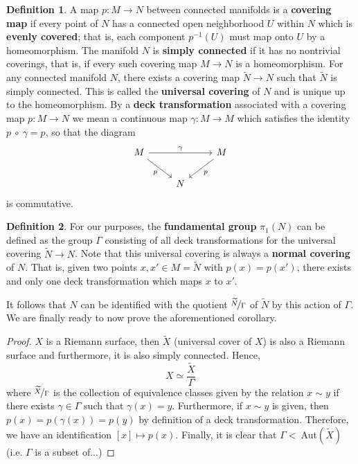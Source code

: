 \documentclass[a4paper, 11pt]{book}
\theoremstyle{definition}
\newtheorem{definition}{Definition}[section]
\theoremstyle{remark}
\begin{document}
    \begin{definition}
        A map $p: M\to N$ between connected manifolds is a \textbf{covering map} if every point of $N$ has a connected open
        neighborhood $U$ within $N$ which is \textbf{evenly covered}; that is, each component $p^{-1}(U)$ must map onto $U$
        by a homeomorphism. The manifold $N$ is \textbf{simply connected} if it has no nontrivial coverings, that is, if every
        such covering map $M \to N$ is a homeomorphism. For any connected manifold $N$, there exists a covering map $\widetilde{N}
        \to N$ such that $\widetilde{N}$ is simply connected. This is called the \textbf{universal covering} of $N$ and is
        unique up to the homeomorphism. By a \textbf{deck transformation} associated with a covering map $p: M\to N$ we mean
        a continuous map $\gamma:M\to M$ which satisfies the identity $p\:\circ\:\gamma = p$, so that the diagram
        \begin{equation*}
        \begin{tikzcd}
            M \arrow[rr, "\gamma"] \arrow[dr, "p",swap]&  & M\arrow[dl, "p"]\\ 
            & N &
        \end{tikzcd}
        \end{equation*}
        is commutative.
    \end{definition}

    \newpage

    \begin{definition}
        For our purposes, the \textbf{fundamental group} $\pi_1(N)$ can be defined as the group $\Gamma$ consisting of all deck
        transformations for the universal covering $\widetilde{N}\to N$. Note that this universal covering is always a 
        \textbf{normal covering} of $N$. That is, given two points $x,x'\in M = \widetilde{N}$ with $p(x)=p(x')$, there exists
        and only one deck transformation which maps $x$ to $x'$.
    \end{definition}

    It follows that $N$ can be identified with the quotient $\nicefrac{\widetilde{N}}{\Gamma}$ of $\widetilde{N}$ by this action
    of $\Gamma$. We are finally ready to now prove the aforementioned corollary.

    \begin{proof}
        $X$ is a Riemann surface, then $\widetilde{X}$ (universal cover of $X$) is also a Riemann surface and furthermore,
        it is also simply connected. Hence,
        \[ X \simeq \frac{\widetilde{X}}{\Gamma} \]
        where $\nicefrac{\widetilde{X}}{\Gamma}$ is the collection of equivalence classes given by the relation $x\sim y$ if there
        exists $\gamma\in\Gamma$ such that $\gamma(x) = y$. Furthermore, if $x\sim y$ is given, then $p(x) = p(\gamma(x)) = p(y)$
        by definition of a deck transformation. Therefore, we have an identification $[x]\mapsto p(x)$. Finally, it is clear that
        $\Gamma <\: $Aut$(\widetilde{X})$ (i.e. $\Gamma$ is a subset of...)
    \end{proof}
\end{document}
